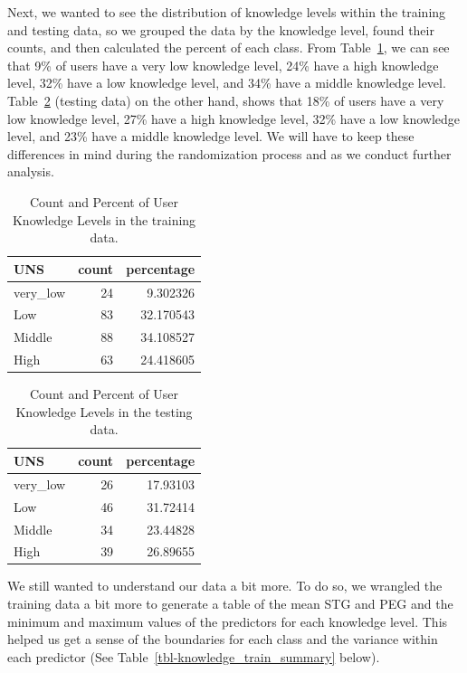 \documentclass[
  letterpaper,
  DIV=11,
  numbers=noendperiod]{scrartcl}
\begin{document}
Next, we wanted to see the distribution of knowledge levels within the
training and testing data, so we grouped the data by the knowledge
level, found their counts, and then calculated the percent of each
class. From Table~\ref{tbl-know_percentage_train}, we can see that 9\%
of users have a very low knowledge level, 24\% have a high knowledge
level, 32\% have a low knowledge level, and 34\% have a middle knowledge
level. Table~\ref{tbl-know_percentage_test} (testing data) on the other
hand, shows that 18\% of users have a very low knowledge level, 27\%
have a high knowledge level, 32\% have a low knowledge level, and 23\%
have a middle knowledge level. We will have to keep these differences in
mind during the randomization process and as we conduct further
analysis.

\begin{longtable}[]{@{}lrr@{}}

\caption{\label{tbl-know_percentage_train}Count and Percent of User
Knowledge Levels in the training data.}

\tabularnewline

\toprule\noalign{}
UNS & count & percentage \\
\midrule\noalign{}
\endhead
\bottomrule\noalign{}
\endlastfoot
very\_low & 24 & 9.302326 \\
Low & 83 & 32.170543 \\
Middle & 88 & 34.108527 \\
High & 63 & 24.418605 \\

\end{longtable}

\begin{longtable}[]{@{}lrr@{}}

\caption{\label{tbl-know_percentage_test}Count and Percent of User
Knowledge Levels in the testing data.}

\tabularnewline

\toprule\noalign{}
UNS & count & percentage \\
\midrule\noalign{}
\endhead
\bottomrule\noalign{}
\endlastfoot
very\_low & 26 & 17.93103 \\
Low & 46 & 31.72414 \\
Middle & 34 & 23.44828 \\
High & 39 & 26.89655 \\

\end{longtable}

We still wanted to understand our data a bit more. To do so, we wrangled
the training data a bit more to generate a table of the mean STG and PEG
and the minimum and maximum values of the predictors for each knowledge
level. This helped us get a sense of the boundaries for each class and
the variance within each predictor (See
Table~\ref{tbl-knowledge_train_summary} below).
\end{document}

